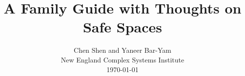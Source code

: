 \documentclass[onecolumn,journal]{IEEEtran}
\begin{document}
\title{\color{Brown} A Family Guide with Thoughts on Safe Spaces \\
\vspace{-0.35ex}}
\author{Chen Shen and Yaneer Bar-Yam \\ New England Complex Systems Institute \\
 \today 
  \vspace{-14ex} \\ 

   
\bigskip
\bigskip

\textbf{}
 }
    
\maketitle


\flushbottom %



\thispagestyle{empty} %




\renewcommand{\thefootnote}{\fnsymbol{footnote}}
\end{document}

